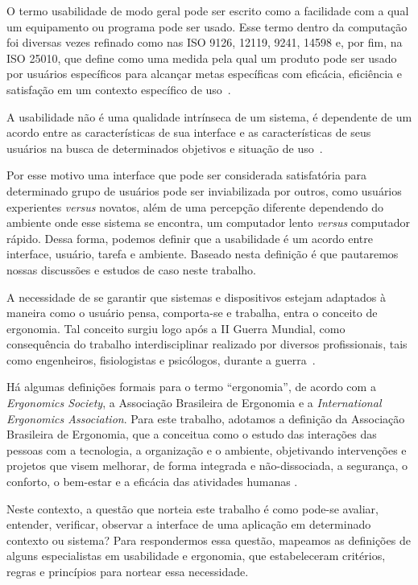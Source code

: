 O termo usabilidade de modo geral pode ser escrito como a facilidade com a qual
um equipamento ou programa pode ser usado. Esse termo dentro da computação foi
diversas vezes refinado como nas ISO 9126, 12119, 9241, 14598 e, por fim, na ISO
25010, que define como uma medida pela qual um produto pode ser usado por
usuários específicos para alcançar metas específicas com eficácia, eficiência e
satisfação em um contexto específico de uso~\cite{iso25010}.

%
A usabilidade não é uma qualidade intrínseca de um sistema, é dependente de um
acordo entre as características de sua interface e as características de seus
usuários na busca de determinados objetivos e situação de uso~\cite{cybis2010}.

%
Por esse motivo uma interface que pode ser considerada satisfatória para
determinado grupo de usuários pode ser inviabilizada por outros, como usuários
experientes \textit{versus} novatos, além de uma percepção diferente dependendo
do ambiente onde esse sistema se encontra, um computador lento \textit{versus}
computador rápido.
%
Dessa forma, podemos definir que a usabilidade é um acordo entre interface,
usuário, tarefa e ambiente. Baseado nesta definição é que pautaremos nossas
discussões e estudos de caso neste trabalho.

%
A necessidade de se garantir que sistemas e dispositivos estejam
adaptados à maneira como o usuário pensa, comporta-se e trabalha, entra o
conceito de ergonomia.
%
Tal conceito surgiu logo após a II Guerra Mundial, como consequência do trabalho
interdisciplinar realizado por diversos profissionais, tais como engenheiros,
fisiologistas e psicólogos, durante a guerra~\cite{lida2005}.

%
Há algumas definições formais para o termo ``ergonomia'', de acordo com a
\textit{Ergonomics Society}, a Associação Brasileira de Ergonomia e a 
\textit{International Ergonomics Association}.
%
Para este trabalho, adotamos a definição da Associação Brasileira de Ergonomia,
que a conceitua como o estudo das interações das pessoas com a tecnologia, a
organização e o ambiente, objetivando intervenções e projetos que visem
melhorar, de forma integrada e não-dissociada, a segurança, o conforto, o
bem-estar e a eficácia das atividades humanas \cite{abergo2013}.

%
Neste contexto, a questão que norteia este trabalho é como pode-se avaliar,
entender, verificar, observar a interface de uma aplicação em determinado
contexto ou sistema?
%
Para respondermos essa questão, mapeamos as definições de alguns especialistas
em usabilidade e ergonomia, que estabeleceram critérios, regras e princípios
para nortear essa necessidade.

